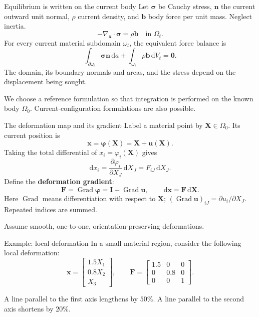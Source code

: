 \documentclass[11pt,aspectratio=169]{beamer}
\newcommand{\bu}{\bm u}
\newcommand{\bx}{\bm x}
\newcommand{\bX}{\bm X}
\newcommand{\bn}{\bm n}
\newcommand{\bb}{\bm b}
\newcommand{\bI}{\bm I}
\newcommand{\bF}{\bm F}
\newcommand{\bsig}{\bm\sigma}
\newcommand{\bphi}{\bm\varphi}
\newcommand{\Grad}{\operatorname{Grad}}
\newcommand{\dd}{\,\mathrm d}
\begin{document}
\begin{frame}{Equilibrium is written on the current body}
Let $\bsig$ be Cauchy stress, $\bn$ the current outward unit normal,
$\rho$ current density, and $\bb$ body force per unit mass.
Neglect inertia.
\[
-\nabla_{\bx}\!\cdot\bsig=\rho\bb
\quad\text{in }\Omega_t.
\]
For every current material subdomain $\omega_t$, the equivalent force balance is
\[
\boxed{
\int_{\partial\omega_t}\bsig\bn\,\mathrm da
+\int_{\omega_t}\rho\bb\,\mathrm dV_t=\bm0.
}
\]
The domain, its boundary normals and areas, and the stress depend on the
displacement being sought.

We choose a reference formulation so that integration is performed on the
known body $\Omega_0$. Current-configuration formulations are also possible.
\end{frame}

\begin{frame}{The deformation map and its gradient}
Label a material point by $\bX\in\Omega_0$. Its current position is
\[
\bx=\bphi(\bX)=\bX+\bu(\bX).
\]
Taking the total differential of $x_i=\varphi_i(\bX)$ gives
\[
\mathrm dx_i
=\frac{\partial\varphi_i}{\partial X_J}\,\mathrm dX_J
=F_{iJ}\,\mathrm dX_J.
\]
Define the \textbf{deformation gradient}:
\[
\boxed{
\bF=\Grad\bphi=\bI+\Grad\bu,\qquad
\dd\bx=\bF\dd\bX.
}
\]
Here $\Grad$ means differentiation with respect to $\bX$;
$(\Grad\bu)_{iJ}=\partial u_i/\partial X_J$.
Repeated indices are summed.

Assume smooth, one-to-one, orientation-preserving deformations.
\end{frame}

\begin{frame}{Example: local deformation}
In a small material region, consider the following local deformation:
\[
\bx=
\begin{bmatrix}1.5X_1\\0.8X_2\\X_3\end{bmatrix},
\qquad
\bF=\begin{bmatrix}1.5&0&0\\0&0.8&0\\0&0&1\end{bmatrix}.
\]
\begin{center}
\end{center}
A line parallel to the first axis lengthens by $50\%$.
A line parallel to the second axis shortens by $20\%$.
\end{frame}
\end{document}
